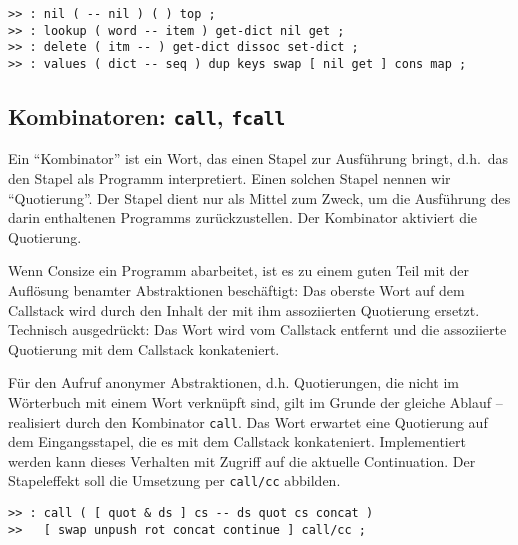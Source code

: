 \begin{verbatim}
>> : nil ( -- nil ) ( ) top ;
>> : lookup ( word -- item ) get-dict nil get ;
>> : delete ( itm -- ) get-dict dissoc set-dict ;
>> : values ( dict -- seq ) dup keys swap [ nil get ] cons map ;
\end{verbatim}

\subsection{Kombinatoren: \texttt{call}, \texttt{fcall}}

Ein "`Kombinator"' ist ein Wort, das einen Stapel zur Ausführung bringt, d.h.\ das den Stapel als Programm interpretiert. Einen solchen Stapel nennen wir "`Quotierung"'. Der Stapel dient nur als Mittel zum Zweck, um die Ausführung des darin enthaltenen Programms zurückzustellen. Der Kombinator aktiviert die Quotierung.



Wenn Consize ein Programm abarbeitet, ist es zu einem guten Teil mit der Auflösung benamter Abstraktionen beschäftigt: Das oberste Wort auf dem Callstack wird durch den Inhalt der mit ihm assoziierten Quotierung ersetzt. Technisch ausgedrückt: Das Wort wird vom Callstack entfernt und die assoziierte Quotierung mit dem Callstack konkateniert.

Für den Aufruf anonymer Abstraktionen, d.h. Quotierungen, die nicht im Wörterbuch mit einem Wort verknüpft sind, gilt im Grunde der gleiche Ablauf -- realisiert durch den Kombinator \verb|call|. Das Wort erwartet eine Quotierung auf dem Eingangsstapel, die es mit dem Callstack konkateniert. Implementiert werden kann dieses Verhalten mit Zugriff auf die aktuelle Continuation. Der Stapeleffekt soll die Umsetzung per \verb|call/cc| abbilden.

\begin{verbatim}
>> : call ( [ quot & ds ] cs -- ds quot cs concat )
>>   [ swap unpush rot concat continue ] call/cc ;
\end{verbatim}

